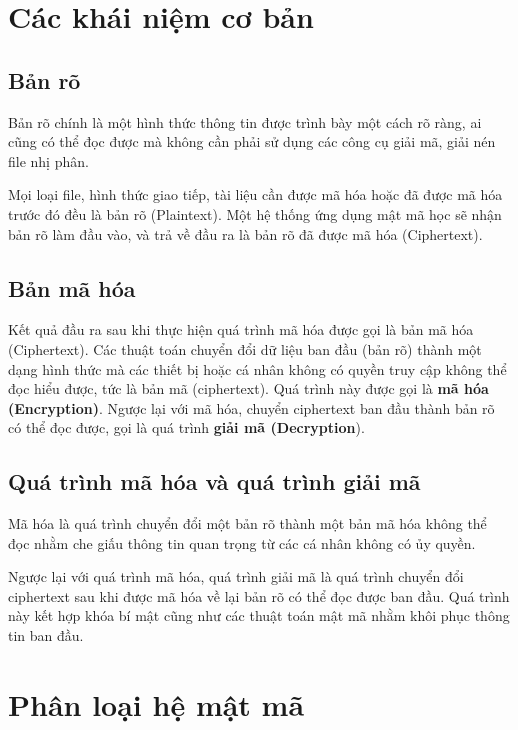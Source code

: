 \section{Các khái niệm cơ bản}

\subsection{Bản rõ}

Bản rõ chính là một hình thức thông tin được trình bày một cách rõ ràng, ai cũng có thể đọc được mà không cần phải sử dụng các công cụ giải mã, giải nén file nhị phân.

Mọi loại file, hình thức giao tiếp, tài liệu cần được mã hóa hoặc đã được mã hóa trước đó đều là bản rõ (Plaintext). Một hệ thống ứng dụng mật mã học sẽ nhận bản rõ làm đầu vào, và trả về đầu ra là bản rõ đã được mã hóa (Ciphertext). \nocite{hemant_bhaat_2024}

\subsection{Bản mã hóa}

Kết quả đầu ra sau khi thực hiện quá trình mã hóa được gọi là bản mã hóa (Ciphertext). Các thuật toán chuyển đổi dữ liệu ban đầu (bản rõ) thành một dạng hình thức mà các thiết bị hoặc cá nhân không có quyền truy cập không thể đọc hiểu được, tức là bản mã (ciphertext). Quá trình này được gọi là \textbf{mã hóa (Encryption)}. Ngược lại với mã hóa, chuyển ciphertext ban đầu thành bản rõ có thể đọc được, gọi là quá trình \textbf{giải mã (Decryption}). \nocite{hemant_bhaat_2024}


\subsection{Quá trình mã hóa và quá trình giải mã}
Mã hóa là quá trình chuyển đổi một bản rõ thành một bản mã hóa không thể đọc nhằm che giấu thông tin quan trọng từ các cá nhân không có ủy quyền. \nocite{ibm_2021}

Ngược lại với quá trình mã hóa, quá trình giải mã là quá trình chuyển đổi ciphertext sau khi được mã hóa về lại bản rõ có thể đọc được ban đầu. Quá trình này kết hợp khóa bí mật cũng như các thuật toán mật mã nhằm khôi phục thông tin ban đầu. \nocite{ibm_2021}

\section{Phân loại hệ mật mã}

